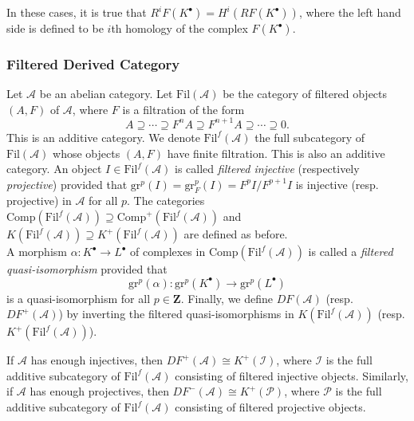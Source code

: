 \begin{remark} 
In these cases, it is true that $R^iF(K^\bullet) = H^i(RF(K^\bullet))$, where the left hand side is defined to be $i$th homology of the complex $F(K^\bullet)$.  
\end{remark}

\subsubsection{Filtered Derived Category}

\begin{definition}
Let $\mathcal{A}$ be an abelian category. Let $\text{Fil}(\mathcal{A})$ be the category of filtered objects $(A,F)$ of $\mathcal{A}$, where $F$ is a filtration of the form
$$
A \supseteq \cdots \supseteq F^n A \supseteq F^{n+1}A \supseteq \cdots \supseteq 0.
$$
This is an additive category. We denote $\text{Fil}^f(\mathcal{A})$ the full subcategory of $\text{Fil}(\mathcal{A})$ whose objects $(A,F)$ have finite filtration.  This is also an additive category. An object $I \in \text{Fil}^f(\mathcal{A})$ is called \emph{filtered injective} (respectively \emph{projective}) provided that $\text{gr}^p(I) = \text{gr}_F^p(I) = F^pI/F^{p+1}I$ is injective (resp. projective) in $\mathcal{A}$ for all $p$. The categories $\text{Comp}(\text{Fil}^f(\mathcal{A})) \supseteq \text{Comp}^+(\text{Fil}^f(\mathcal{A}))$ and $K(\text{Fil}^f(\mathcal{A})) \supseteq K^+(\text{Fil}^f(\mathcal A))$ are defined as before.
\\
A morphism $\alpha : K^\bullet \to L^\bullet$ of complexes in $\text{Comp}(\text{Fil}^f(\mathcal{A}))$ is called a \emph{filtered quasi-isomorphism} provided that 
$$
\mathrm{gr}^p(\alpha): \mathrm{gr}^p(K^\bullet) \to \mathrm{gr}^p(L^\bullet)
$$ 
is a quasi-isomorphism for all $p \in \mathbf{Z}$. Finally, we define $D F(\mathcal{A})$ (resp. $D F^+(\mathcal{A})$) by inverting the filtered quasi-isomorphisms in $K(\text{Fil}^f(\mathcal{A}))$ (resp. $K^+(\text{Fil}^f(\mathcal{A}))$). 
\end{definition}

\begin{lemma}
If $\mathcal{A}$ has enough injectives, then $D F^+(\mathcal{A}) \cong K^+(\mathcal{I})$, where $\mathcal{I}$ is the full additive subcategory of $\text{Fil}^f(\mathcal{A})$ consisting of filtered injective objects. Similarly, if $\mathcal{A}$ has enough projectives, then $D F^-(\mathcal{A}) \cong K^+(\mathcal{P})$, where $\mathcal P$ is the full additive subcategory of $\text{Fil}^f(\mathcal{A})$ consisting of filtered projective objects.
\end{lemma}

